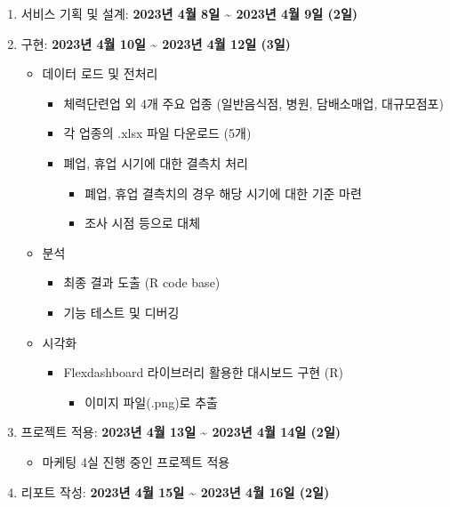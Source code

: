 \documentclass[
]{book}
\providecommand{\tightlist}{%
  \setlength{\itemsep}{0pt}\setlength{\parskip}{0pt}}
\begin{document}
\begin{enumerate}
\def\labelenumi{\arabic{enumi}.}
\item
  서비스 기획 및 설계: \textbf{2023년 4월 8일 \textasciitilde{} 2023년 4월 9일 (2일)}
\item
  구현: \textbf{2023년 4월 10일 \textasciitilde{} 2023년 4월 12일 (3일)}

  \begin{itemize}
  \item
    데이터 로드 및 전처리

    \begin{itemize}
    \item
      체력단련업 외 4개 주요 업종 (일반음식점, 병원, 담배소매업, 대규모점포)
    \item
      각 업종의 .xlsx 파일 다운로드 (5개)
    \item
      폐업, 휴업 시기에 대한 결측치 처리

      \begin{itemize}
      \item
        폐업, 휴업 결측치의 경우 해당 시기에 대한 기준 마련
      \item
        조사 시점 등으로 대체
      \end{itemize}
    \end{itemize}
  \item
    분석

    \begin{itemize}
    \item
      최종 결과 도출 (R code base)
    \item
      기능 테스트 및 디버깅
    \end{itemize}
  \item
    시각화

    \begin{itemize}
    \item
      Flexdashboard 라이브러리 활용한 대시보드 구현 (R)

      \begin{itemize}
      \tightlist
      \item
        이미지 파일(.png)로 추출
      \end{itemize}
    \end{itemize}
  \end{itemize}
\item
  프로젝트 적용: \textbf{2023년 4월 13일 \textasciitilde{} 2023년 4월 14일 (2일)}

  \begin{itemize}
  \tightlist
  \item
    마케팅 4실 진행 중인 프로젝트 적용
  \end{itemize}
\item
  리포트 작성: \textbf{2023년 4월 15일 \textasciitilde{} 2023년 4월 16일 (2일)}


\end{enumerate}
\end{document}
